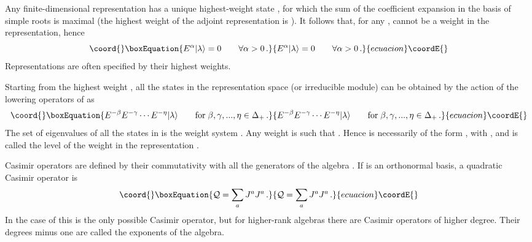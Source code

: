 \documentclass[a4paper,12pt]{report}
\begin{document}
Any finite-dimensional representation has a unique highest-weight state \myHighlight{$|\lambda\rangle$}\coordHE{}, for which the sum of
the coefficient expansion in the basis of simple roots is maximal (the highest weight of the adjoint
representation is \myHighlight{$\theta$}\coordHE{}). It follows that, for any \coordHE{}, \myHighlight{$\lambda+\alpha$}\coordHE{} cannot be a weight in the
representation, hence
\begin{equation}\coord{}\boxEquation{
E^{\alpha}|\lambda\rangle=0\qquad\forall\alpha>0\,.
}{
E^{\alpha}|\lambda\rangle=0\qquad\forall\alpha>0\,.
}{ecuacion}\coordE{}\end{equation}
Representations are often specified by their highest weights.

Starting from the highest weight \myHighlight{$|\lambda\rangle$}\coordHE{}, all the states in the representation space (or irreducible
module) \coordHE{} can be obtained by the action of the lowering operators of \coordHE{} as
\begin{equation}\coord{}\boxEquation{
E^{-\beta}E^{-\gamma}\cdots E^{-\eta}|\lambda\rangle\qquad \textrm{for} \; \beta,\gamma,...,\eta\in\Delta_{+}\,.
}{
E^{-\beta}E^{-\gamma}\cdots E^{-\eta}|\lambda\rangle\qquad \textrm{for} \; \beta,\gamma,...,\eta\in\Delta_{+}\,.
}{ecuacion}\coordE{}\end{equation}
The set of eigenvalues of all the states in \coordHE{} is the weight system \myHighlight{$\Omega_{\lambda}$}\coordHE{}. Any weight
\coordHE{} is such that \coordHE{}. Hence \coordHE{} is necessarily of
the form \coordHE{}, with \coordHE{}, and  \coordHE{} is called the level of the
weight \coordHE{} in the representation \myHighlight{$\lambda$}\coordHE{}.

Casimir operators are defined by their commutativity with all the generators of the algebra \coordHE{}. If \coordHE{}
is an orthonormal basis, a quadratic Casimir operator is
\begin{equation}\coord{}\boxEquation{
{\cal Q}=\sum_{a}J^{a}J^{a}\,.
}{
{\cal Q}=\sum_{a}J^{a}J^{a}\,.
}{ecuacion}\coordE{}\end{equation}
In the case of \coordHE{} this is the only possible Casimir operator, but for higher-rank algebras there are Casimir
operators of higher degree. Their degrees minus one are called the exponents of the algebra.
\end{document}
